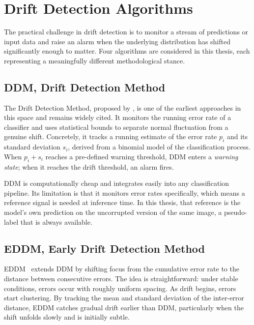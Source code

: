 \section{Drift Detection Algorithms}
\label{sec:driftdetection}

The practical challenge in drift detection is to monitor a stream of predictions or input data and raise an alarm when the underlying distribution has shifted significantly enough to matter. Four algorithms are considered in this thesis, each representing a meaningfully different methodological stance.

\subsection{DDM, Drift Detection Method}

The Drift Detection Method, proposed by \textcite{Gama2004}, is one of the earliest approaches in this space and remains widely cited. It monitors the running error rate of a classifier and uses statistical bounds to separate normal fluctuation from a genuine shift. Concretely, it tracks a running estimate of the error rate $p_i$ and its standard deviation $s_i$, derived from a binomial model of the classification process. When $p_i + s_i$ reaches a pre-defined warning threshold, DDM enters a \textit{warning state}; when it reaches the drift threshold, an alarm fires.

DDM is computationally cheap and integrates easily into any classification pipeline. Its limitation is that it monitors error rates specifically, which means a reference signal is needed at inference time. In this thesis, that reference is the model's own prediction on the uncorrupted version of the same image, a pseudo-label that is always available.

\subsection{EDDM, Early Drift Detection Method}

EDDM~\autocite{baena2006early} extends DDM by shifting focus from the cumulative error rate to the distance between consecutive errors. The idea is straightforward: under stable conditions, errors occur with roughly uniform spacing. As drift begins, errors start clustering. By tracking the mean and standard deviation of the inter-error distance, EDDM catches gradual drift earlier than DDM, particularly when the shift unfolds slowly and is initially subtle.

